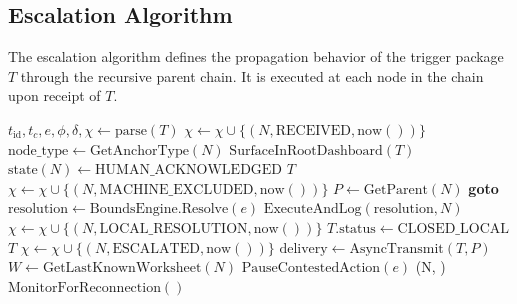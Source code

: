 \subsection{Escalation Algorithm}

The escalation algorithm defines the propagation behavior of the trigger package $T$ through the recursive parent chain. It is executed at each node in the chain upon receipt of $T$.

\bigskip
\begin{algorithm}
\caption{Bailout Escalation Algorithm (executed at each node $N$ in the propagation chain)}
\label{alg:escalation}
\begin{algorithmic}[1]
\Statex
{}
    \State $t_{\text{id}}, t_c, e, \phi, \delta, \chi \gets \text{parse}(T)$
    \State $\chi \gets \chi \cup \{(N, \text{RECEIVED}, \text{now}())\}$
    \State
    \State $\text{node\_type} \gets \text{GetAnchorType}(N)$
    \State
        \State {}
        \State $\text{SurfaceInRootDashboard}(T)$
        \State $\text{state}(N) \gets \text{HUMAN\_ACKNOWLEDGED}$
        \State \Return $T$
    \EndIf
    \State
        \State {}
        \State $\chi \gets \chi \cup \{(N, \text{MACHINE\_EXCLUDED}, \text{now}())\}$
        \State $P \gets \text{GetParent}(N)$
        \State \textbf{goto} 
    \EndIf
    \State
    \State {}
    \State $\text{resolution} \gets \text{BoundsEngine.Resolve}(e)$
    \State
        \State {}
        \State $\text{ExecuteAndLog}(\text{resolution}, N)$
        \State $\chi \gets \chi \cup \{(N, \text{LOCAL\_RESOLUTION}, \text{now}())\}$
        \State $T.\text{status} \gets \text{CLOSED\_LOCAL}$
        \State \Return $T$
    \EndIf
    \State
    \State {}
    \State {}
\Statex
{}
    \State $\chi \gets \chi \cup \{(N, \text{ESCALATED}, \text{now}())\}$
    \State $\text{delivery} \gets \text{AsyncTransmit}(T, P)$
    \State {}
    \EndIf
    \State \Return {}
\Statex
{}
    \State {}
    \State $W \gets \text{GetLastKnownWorksheet}(N)$
    \State $\text{PauseContestedAction}(e)$
    \State {}(N, )
    \State $\text{MonitorForReconnection}()$
    \State {}
\EndFunction
\end{algorithmic}
\end{algorithm}

